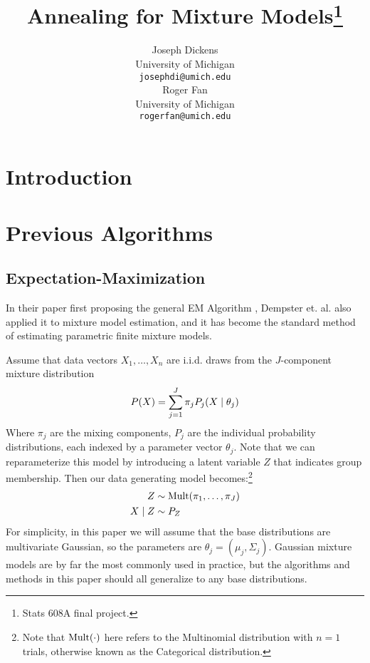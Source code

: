 \documentclass{article}
\newcommand*{\cond}{\;\ifnum\currentgrouptype=16 \middle\fi|\;}
\newcommand*{\mt}[1]{\text{\normalfont #1}}
\newcommand*{\dist}{\sim}
\theoremstyle{definition}
\theoremstyle{algodesc}
\begin{document}
\title{Annealing for Mixture Models\thanks{Stats 608A final project.}}
\author{
  Joseph Dickens \\
  University of Michigan \\
  \texttt{josephdi@umich.edu} \\
\And
  Roger Fan \\
  University of Michigan\\
  \texttt{rogerfan@umich.edu} \\
}

\maketitle


\section{Introduction}

\section{Previous Algorithms}


\subsection{Expectation-Maximization}

In their paper first proposing the general EM Algorithm \cite{dempsterlairdrubin77}, Dempster et. al. also applied it to mixture model estimation, and it has become the standard method of estimating parametric finite mixture models.

Assume that data vectors $X_1, \dots, X_n$ are i.i.d. draws from the $J$-component mixture distribution
\begin{equation*}
P(X) = \sum_{j=1}^J \pi_j P_j(X \cond \theta_j)
\end{equation*}
Where $\pi_j$ are the mixing components, $P_j$ are the individual probability distributions, each indexed by a parameter vector $\theta_j$. Note that we can reparameterize this model by introducing a latent variable $Z$ that indicates group membership. Then our data generating model becomes:\footnote{Note that $\mt{Mult}(\cdot)$ here refers to the Multinomial distribution with $n=1$ trials, otherwise known as the Categorical distribution.}
\begin{align*}
Z &\dist \mt{Mult}(\pi_1, \dots, \pi_J) \\
X \cond Z &\dist P_Z
\end{align*}
For simplicity, in this paper we will assume that the base distributions are multivariate Gaussian, so the parameters are $\theta_j = (\mu_j, \Sigma_j)$. Gaussian mixture models are by far the most commonly used in practice, but the algorithms and methods in this paper should all generalize to any base distributions.
\end{document}

